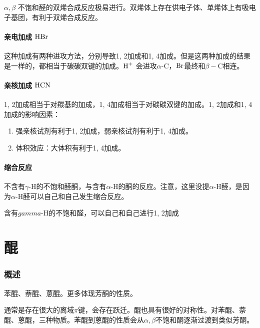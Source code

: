 \documentclass[a4paper]{ctexrep}
\begin{document}
    $\alpha, \beta$ 不饱和醛的双烯合成反应极易进行。双烯体上存在供电子体、单烯体上有吸电子基团，有利于双烯合成反应。

    \subsubsection{亲电加成 $\ce{HBr}$}

    这种加成有两种进攻方法，分别导致1, 2加成和1, 4加成。但是这两种加成的结果是一样的，都相当于碳碳双键的加成。$\ce{H+}$ 会进攻$\alpha$-C，$\ce{Br}$最终和$\beta-$C相连。

    \subsubsection{亲核加成 $\ce{HCN}$}

    1, 2加成相当于对羰基的加成，1, 4加成相当于对碳碳双键的加成。1, 2加成和1, 4加成的影响因素：

    \begin{enumerate}
        \item 强亲核试剂有利于1, 2加成，弱亲核试剂有利于1, 4加成。
        \item 体积效应：大体积有利于1, 4加成。
    \end{enumerate}

    \subsubsection{缩合反应}

    不含有$\gamma$-H的不饱和醛酮，与含有$\alpha$-H的酮的反应。注意，这里没提$\alpha$-H醛，是因为$\alpha$-H醛可以自己和自己发生缩合反应。
    \begin{centering}
        
    \end{centering}

    含有$gamma$-H的不饱和醛，可以自己和自己进行1, 2加成

    \chapter{醌}

    \subsection{概述}

    苯醌、萘醌、蒽醌。更多体现芳酮的性质。

    通常是存在很大的离域$\pi$键，会存在跃迁。醌也具有很好的对称性。对苯醌、萘醌、蒽醌，三种物质。苯醌到蒽醌的性质会从$\alpha, \beta$不饱和酮逐渐过渡到类似芳酮。

    
\end{document}
